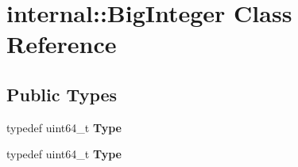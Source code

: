 \hypertarget{classinternal_1_1BigInteger}{}\section{internal\+:\+:Big\+Integer Class Reference}
\label{classinternal_1_1BigInteger}
\subsection*{Public Types}
\begin{DoxyCompactItemize}
\item 
\mbox{\label{classinternal_1_1BigInteger_a1310812fca26ebae77594ba08678fc4c}} 
typedef uint64\+\_\+t {\bfseries Type}
\item 
\mbox{\label{classinternal_1_1BigInteger_a1310812fca26ebae77594ba08678fc4c}} 
typedef uint64\+\_\+t {\bfseries Type}
\end{DoxyCompactItemize}

